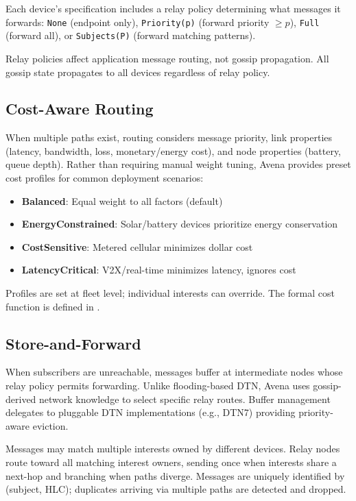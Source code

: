 \documentclass[journal]{IEEEtran}
\begin{document}
Each device's specification includes a relay policy determining what messages it forwards: \texttt{None} (endpoint only), \texttt{Priority(p)} (forward priority $\geq p$), \texttt{Full} (forward all), or \texttt{Subjects(P)} (forward matching patterns).

Relay policies affect application message routing, not gossip propagation. All gossip state propagates to all devices regardless of relay policy.

\subsection{Cost-Aware Routing}

When multiple paths exist, routing considers message priority, link properties (latency, bandwidth, loss, monetary/energy cost), and node properties (battery, queue depth). Rather than requiring manual weight tuning, Avena provides preset cost profiles for common deployment scenarios:

\begin{itemize}[noitemsep]
\item \textbf{Balanced}: Equal weight to all factors (default)
\item \textbf{EnergyConstrained}: Solar/battery devices prioritize energy conservation
\item \textbf{CostSensitive}: Metered cellular minimizes dollar cost
\item \textbf{LatencyCritical}: V2X/real-time minimizes latency, ignores cost
\end{itemize}

Profiles are set at fleet level; individual interests can override. The formal cost function is defined in .

\subsection{Store-and-Forward}

When subscribers are unreachable, messages buffer at intermediate nodes whose relay policy permits forwarding. Unlike flooding-based DTN, Avena uses gossip-derived network knowledge to select specific relay routes. Buffer management delegates to pluggable DTN implementations (e.g., DTN7) providing priority-aware eviction.

Messages may match multiple interests owned by different devices. Relay nodes route toward all matching interest owners, sending once when interests share a next-hop and branching when paths diverge. Messages are uniquely identified by (subject, HLC); duplicates arriving via multiple paths are detected and dropped.
\end{document}
